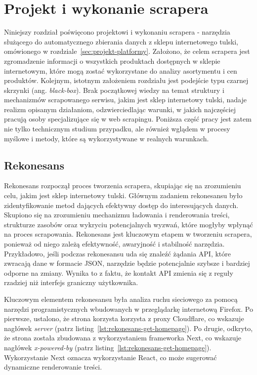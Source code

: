 \newpage


\section{Projekt i wykonanie scrapera}\label{sec:projekt-scrapera}

Niniejszy rozdział poświęcono projektowi i wykonaniu scrapera - narzędzia służącego do automatycznego zbierania danych z sklepu internetowego tulski, omówionego w rozdziale~\ref{sec:projekt-platformy}.
Założono, że celem scrapera jest zgromadzenie informacji o wszystkich produktach dostępnych w sklepie internetowym, które mogą zostać wykorzystane do analizy asortymentu i cen produktów.
Kolejnym, istotnym założeniem rozdziału jest podejście typu czarnej skrzynki (ang. \emph{black-box})\cite{sekurak-testy-penetracyjne}.
Brak początkowej wiedzy na temat struktury i mechanizmów scrapowanego serwisu, jakim jest sklep internetowy tulski, nadaje realizm opisanym działaniom, odzwierciedlając warunki, w jakich najczęściej pracują osoby specjalizujące się w web scrapingu.
Poniższa część pracy jest zatem nie tylko technicznym studium przypadku, ale również wglądem w procesy myślowe i metody, które są wykorzystywane w realnych warunkach.

\subsection{Rekonesans}\label{subsec:rekonesans}

Rekonesans rozpoczął proces tworzenia scrapera, skupiając się na zrozumieniu celu, jakim jest sklep internetowy tulski.
Głównym zadaniem rekonesansu było zidentyfikowanie metod dających efektywny dostęp do interesujących danych.
Skupiono się na zrozumieniu mechanizmu ładowania i renderowania treści, strukturze zasobów oraz wykryciu potencjalnych wyzwań, które mogłyby wpłynąć na proces scrapowania.
Rekonesans jest kluczowym etapem w tworzeniu scrapera, ponieważ od niego zależą efektywność, awaryjność i stabilność narzędzia.
Przykładowo, jeśli podczas rekonesansu uda się znaleźć żądania API, które zwracają dane w formacie JSON, narzędzie będzie potencjalnie szybsze i bardziej odporne na zmiany.
Wynika to z faktu, że kontakt API zmienia się z reguły rzadziej niż interfejs graniczny użytkownika.

Kluczowym elementem rekonesansu była analiza ruchu sieciowego za pomocą narzędzi programistycznych wbudowanych w przeglądarkę internetową Firefox.
Po pierwsze, ustalono, że strona korzysta korzysta z proxy Cloudflare, co wskazuje nagłówek \emph{server} (patrz listing~\ref{lst:rekonesans-get-homepage}).
Po drugie, odkryto, że strona została zbudowana z wykorzystaniem frameworka Next, co wskazuje nagłówek \emph{x-powered-by} (patrz listing~\ref{lst:rekonesans-get-homepage}).
Wykorzystanie Next oznacza wykorzystanie React, co może sugerować dynamiczne renderowanie treści.

